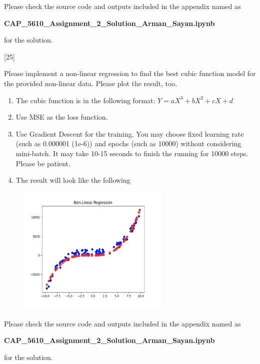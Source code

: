 \documentclass[12pt,letterpaper, onecolumn]{exam}
\begin{document}
\begin{questions}
\begin{solution}
        Please check the source code and outputs included in the appendix named as

        \begin{center}
            \textbf{CAP\_5610\_Assignment\_2\_Solution\_Arman\_Sayan.ipynb}
        \end{center}
        
        for the solution.
    \end{solution}

    \pagebreak

    [25]

    Please implement a non-linear regression to find the best cubic function model for the 
    provided non-linear data. Please plot the result, too.

    \begin{enumerate}[label=(\arabic*)]
        \item The cubic function is in the following format: $Y=aX^3+bX^2+cX+d$
        \item Use MSE as the loss function.
        \item Use Gradient Descent for the training. You may choose fixed learning rate (such as
        0.000001 (1e-6)) and epochs (such as 10000) without considering mini-batch. It may take
        10-15 seconds to finish the running for 10000 steps. Please be patient.
        \item The result will look like the following
    \end{enumerate}

    \begin{figure}[h]
        \centering
        \includegraphics[width=0.65\textwidth]{non-linear.png}
    \end{figure}

    \begin{solution}

        Please check the source code and outputs included in the appendix named as

        \begin{center}
            \textbf{CAP\_5610\_Assignment\_2\_Solution\_Arman\_Sayan.ipynb}
        \end{center}
        
        for the solution.
    \end{solution}

    \pagebreak
    
\end{questions}
\end{document}
